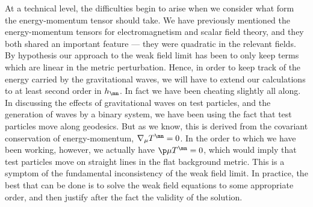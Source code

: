At a technical level, the difficulties begin to arise when we 
consider what form the energy-momentum tensor should take.
We have previously mentioned the energy-momentum tensors for
electromagnetism and scalar field theory, and they both
shared an important feature --- they were quadratic in the
relevant fields.  By hypothesis our approach to the weak field
limit has been to only keep terms which are linear in the 
metric perturbation.  Hence, in order to keep track of the
energy carried by the gravitational waves, we will have to
extend our calculations to at least second order in $h_\mn$.
In fact we have been cheating slightly all along.  In 
discussing the effects of gravitational waves on test particles,
and the generation of waves by a binary system, we have been
using the fact that test particles move along geodesics.  But
as we know, this is derived from the covariant conservation of
energy-momentum, $\nabla_\mu T^\mn=0$.  In the order to which
we have been working, however, we actually have $\p\mu T^\mn=0$,
which would imply that test particles move on straight lines
in the flat background metric.  This is a symptom of the
fundamental inconsistency of the weak field limit.  In practice,
the best that can be done is to solve the weak field equations
to some appropriate order, and then justify after the fact the
validity of the solution.


